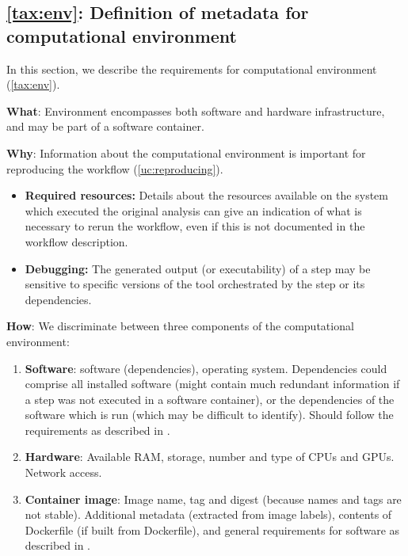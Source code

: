 \subsection{\ref{tax:env}: Definition of metadata for computational environment}
\label{sec:env_reqs}

In this section, we describe the requirements for computational environment (\ref{tax:env}).

\textbf{What}: Environment encompasses both software and hardware infrastructure, and may be part of a software container.

\textbf{Why}: Information about the computational environment is important for reproducing the workflow (\ref{uc:reproducing}). 

\begin{itemize}
    \item \textbf{Required resources:} Details about the resources available on the system which executed the original analysis can give an indication of what is necessary to rerun the workflow, even if this is not documented in the workflow description.
    \item \textbf{Debugging:} The generated output (or executability) of a step may be sensitive to specific versions of the tool orchestrated by the step or its dependencies.
\end{itemize}

\textbf{How}: We discriminate between three components of the computational environment:
\begin{enumerate}[label=\textbf{ENV\arabic*}]
    \item \textbf{Software}: software (dependencies), operating system. Dependencies could comprise all installed software (might contain much redundant information if a step was not executed in a software container), or the dependencies of the software which is run (which may be difficult to identify). Should follow the requirements as described in . \label{req:env_software}
    \item \textbf{Hardware}: Available RAM, storage, number and type of CPUs and GPUs. Network access. \label{req:env_hardware}
    \item \textbf{Container image}: Image name, tag and digest (because names and tags are not stable). Additional metadata (extracted from image labels), contents of Dockerfile (if built from Dockerfile), and general requirements for software as described in . \label{req:env_image}
\end{enumerate}